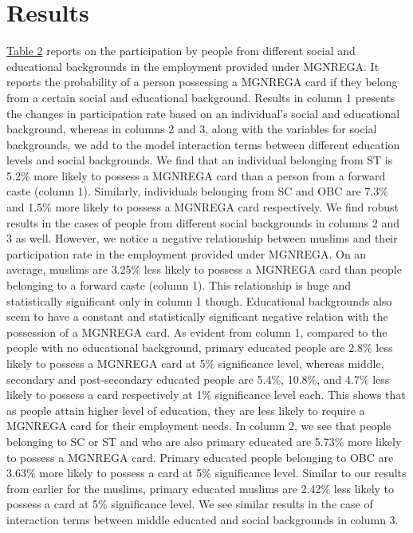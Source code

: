 \documentclass{article}
\begin{document}
\section{Results}
\label{results}
\hyperref[tab2]{Table 2} reports on the participation by people from different social and educational backgrounds in the employment provided under MGNREGA. It reports the probability of a person possessing a MGNREGA card if they belong from a certain social and educational background. Results in column 1 presents the changes in participation rate based on an individual’s social and educational background, whereas in columns 2 and 3, along with the variables for social backgrounds, we add to the model interaction terms between different education levels and social backgrounds. We find that an individual belonging from ST is 5.2\% more likely to possess a MGNREGA card than a person from a forward caste (column 1). Similarly, individuals belonging from SC and OBC are 7.3\% and 1.5\% more likely to possess a MGNREGA card respectively. We find robust results in the cases of people from different social backgrounds in columns 2 and 3 as well. However, we notice a negative relationship between muslims and their participation rate in the employment provided under MGNREGA. On an average, muslims are 3.25\% less likely to possess a MGNREGA card than people belonging to a forward caste (column 1). This relationship is huge and statistically significant only in column 1 though. Educational backgrounds also seem to have a constant and statistically significant negative relation with the possession of a MGNREGA card. As evident from column 1, compared to the people with no educational background, primary educated people are 2.8\% less likely to possess a MGNREGA card at 5\% significance level, whereas middle, secondary and post-secondary educated people are 5.4\%, 10.8\%, and 4.7\% less likely to possess a card respectively at 1\% significance level each. This shows that as people attain higher level of education, they are less likely to require a MGNREGA card for their employment needs.
In column 2, we see that people belonging to SC or ST and who are also primary educated are 5.73\% more likely to possess a MGNREGA card. Primary educated people belonging to OBC are 3.63\% more likely to possess a card at 5\% significance level. Similar to our results from earlier for the muslims, primary educated muslims are 2.42\% less likely to possess a card at 5\% significance level. We see similar results in the case of interaction terms between middle educated and social backgrounds in column 3. 
\end{document}
